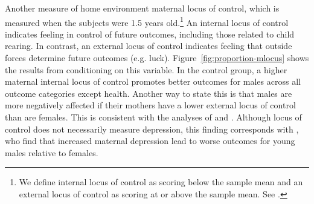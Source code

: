Another measure of home environment maternal locus of control, which is measured when the subjects were 1.5 years old.\footnote{We define internal locus of control as scoring below the sample mean and an external locus of control as scoring at or above the sample mean. See \citet{Rotter_1966_PMGaA}.} An internal locus of control indicates feeling in control of future outcomes, including those related to child rearing. In contrast, an external locus of control indicates feeling that outside forces determine future outcomes (e.g. luck). Figure~\ref{fig:proportion-mlocus} shows the results from conditioning on this variable. In the control group, a higher maternal internal locus of control promotes better outcomes for males across all outcome categories except health. Another way to state this is that males are more negatively affected if their mothers have a lower external locus of control than are females. This is consistent with the analyses of \citet{Schore_2017_IMHJ} and \citet{golding2016psychology}. Although locus of control does not necessarily measure depression, this finding corresponds with \citet{Beeghly-etal_2017_IMHJ}, who find that increased maternal depression lead to worse outcomes for young males relative to females.

